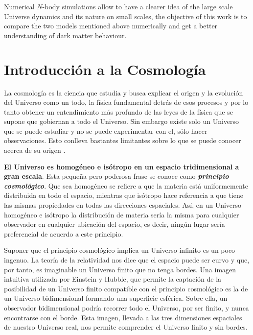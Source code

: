 \documentclass[a4paper,openright,12pt]{book}
\begin{document}
Numerical $N$-body simulations allow to have a clearer idea of the large scale Universe dynamics and its nature on small scales, the objective of this work is to compare the two models mentioned above numerically and get a better understanding of dark matter behaviour.
\tableofcontents %

\cleardoublepage
{} %
\listoffigures %

\cleardoublepage
{} %
\listoftables %




\chapter{Introducción a la Cosmología}
La cosmología es la ciencia que estudia y busca explicar el origen y la evolución del Universo como un todo, la física fundamental detrás de esos procesos y por lo tanto obtener un entendimiento más profundo de las leyes de la física que se supone que gobiernan a todo el Universo. Sin embargo existe solo un Universo que se puede estudiar y no se puede  experimentar con el, sólo hacer observaciones. Esto conlleva bastantes limitantes sobre lo que se puede conocer acerca de su origen \cite{1.01}. 

\textbf{El Universo es homogéneo e isótropo en un espacio tridimensional a gran escala}. Esta pequeña pero poderosa frase se conoce como \textbf{\textit{principio cosmológico}}. Que sea homogéneo se refiere a que la materia está uniformemente distribuida en todo el espacio, mientras que isótropo hace referencia a que tiene las mismas propiedades en todas las direcciones espaciales. Así, en un Universo homogéneo e isótropo la distribución de materia sería la misma para cualquier observador en cualquier ubicación del espacio, es decir, ningún lugar sería preferencial de acuerdo a este principio.

Suponer que el principio cosmológico implica un Universo infinito es un poco ingenuo. La teoría de la relatividad nos dice que el espacio puede ser curvo y que, por tanto, es imaginable un Universo finito que no tenga bordes. Una imagen intuitiva utilizada por Einstein y Hubble, que permite la captación de la posibilidad de un Universo finito compatible con el principio cosmológico es la de un Universo bidimensional formando una superficie esférica. Sobre ella, un observador bidimensional podría recorrer todo el Universo, por ser finito, y nunca encontrarse con el borde. Esta imagen, llevada a las tres dimensiones espaciales de nuestro Universo real, nos permite comprender el Universo finito y sin bordes.
\end{document}
